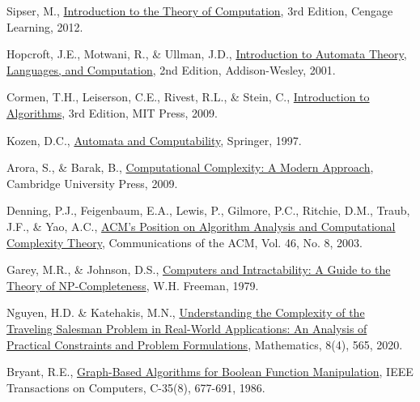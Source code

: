 \documentclass{article}
\theoremstyle{theorem}
\theoremstyle{definition}
\theoremstyle{remark}
\begin{document}
\begin{thebibliography}{99}
 Sipser, M., \href{https://www.cengage.com/c/introduction-to-the-theory-of-computation-3e-sipser/9781133187790/}{Introduction to the Theory of Computation}, 3rd Edition, Cengage Learning, 2012.

 Hopcroft, J.E., Motwani, R., \& Ullman, J.D., \href{https://www.pearson.com/en-us/subject-catalog/p/introduction-to-automata-theory-languages-and-computation/P200000003505/9780201441246}{Introduction to Automata Theory, Languages, and Computation}, 2nd Edition, Addison-Wesley, 2001.

 Cormen, T.H., Leiserson, C.E., Rivest, R.L., \& Stein, C., \href{https://mitpress.mit.edu/books/introduction-algorithms-third-edition}{Introduction to Algorithms}, 3rd Edition, MIT Press, 2009.

 Kozen, D.C., \href{https://link.springer.com/book/10.1007/978-1-4612-1844-9}{Automata and Computability}, Springer, 1997.

 Arora, S., \& Barak, B., \href{https://theory.cs.princeton.edu/complexity/}{Computational Complexity: A Modern Approach}, Cambridge University Press, 2009.

 Denning, P.J., Feigenbaum, E.A., Lewis, P., Gilmore, P.C., Ritchie, D.M., Traub, J.F., \& Yao, A.C., \href{https://dl.acm.org/doi/10.1145/944234.944235}{ACM's Position on Algorithm Analysis and Computational Complexity Theory}, Communications of the ACM, Vol. 46, No. 8, 2003.

 Garey, M.R., \& Johnson, D.S., \href{https://dl.acm.org/doi/book/10.5555/578533}{Computers and Intractability: A Guide to the Theory of NP-Completeness}, W.H. Freeman, 1979.

 Nguyen, H.D. \& Katehakis, M.N., \href{https://www.mdpi.com/2227-7390/8/4/565}{Understanding the Complexity of the Traveling Salesman Problem in Real-World Applications: An Analysis of Practical Constraints and Problem Formulations}, Mathematics, 8(4), 565, 2020.

 Bryant, R.E., \href{https://ieeexplore.ieee.org/document/1676819}{Graph-Based Algorithms for Boolean Function Manipulation}, IEEE Transactions on Computers, C-35(8), 677-691, 1986.
\end{thebibliography}
\end{document}
